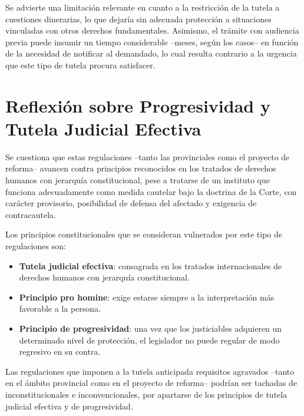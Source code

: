 \documentclass[12pt,oneside]{book}
\begin{document}
Se advierte una limitación relevante en cuanto a la restricción de la tutela a cuestiones dinerarias, lo que dejaría sin adecuada protección a situaciones vinculadas con otros derechos fundamentales. Asimismo, el trámite con audiencia previa puede insumir un tiempo considerable --meses, según los casos-- en función de la necesidad de notificar al demandado, lo cual resulta contrario a la urgencia que este tipo de tutela procura satisfacer.

\section{Reflexión sobre Progresividad y Tutela Judicial Efectiva}

Se cuestiona que estas regulaciones --tanto las provinciales como el proyecto de reforma-- avancen contra principios reconocidos en los tratados de derechos humanos con jerarquía constitucional, pese a tratarse de un instituto que funciona adecuadamente como medida cautelar bajo la doctrina de la Corte, con carácter provisorio, posibilidad de defensa del afectado y exigencia de contracautela.

Los principios constitucionales que se consideran vulnerados por este tipo de regulaciones son:

\begin{itemize}
    \item \textbf{Tutela judicial efectiva}: consagrada en los tratados internacionales de derechos humanos con jerarquía constitucional.
    \item \textbf{Principio pro homine}: exige estarse siempre a la interpretación más favorable a la persona.
    \item \textbf{Principio de progresividad}: una vez que los justiciables adquieren un determinado nivel de protección, el legislador no puede regular de modo regresivo en su contra.
\end{itemize}

\begin{important}
Las regulaciones que imponen a la tutela anticipada requisitos agravados --tanto en el ámbito provincial como en el proyecto de reforma-- podrían ser tachadas de inconstitucionales e inconvencionales, por apartarse de los principios de tutela judicial efectiva y de progresividad.
\end{important}

\end{document}
